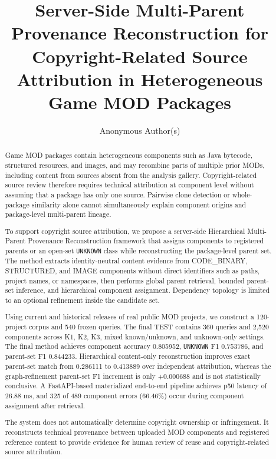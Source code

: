\documentclass[runningheads]{llncs}
\begin{document}
\title{Server-Side Multi-Parent Provenance Reconstruction for Copyright-Related Source Attribution in Heterogeneous Game MOD Packages}
\author{Anonymous Author(s)}
\maketitle

\begin{abstract}
Game MOD packages contain heterogeneous components such as Java bytecode, structured resources, and images, and may recombine parts of multiple prior MODs, including content from sources absent from the analysis gallery. Copyright-related source review therefore requires technical attribution at component level without assuming that a package has only one source. Pairwise clone detection or whole-package similarity alone cannot simultaneously explain component origins and package-level multi-parent lineage.

To support copyright source attribution, we propose a server-side Hierarchical Multi-Parent Provenance Reconstruction framework that assigns components to registered parents or an open-set \texttt{UNKNOWN} class while reconstructing the package-level parent set. The method extracts identity-neutral content evidence from CODE\_BINARY, STRUCTURED, and IMAGE components without direct identifiers such as paths, project names, or namespaces, then performs global parent retrieval, bounded parent-set inference, and hierarchical component assignment. Dependency topology is limited to an optional refinement inside the candidate set.

Using current and historical releases of real public MOD projects, we construct a 120-project corpus and 540 frozen queries. The final TEST contains 360 queries and 2,520 components across K1, K2, K3, mixed known/unknown, and unknown-only settings. The final method achieves component accuracy 0.805952, \texttt{UNKNOWN} F1 0.753786, and parent-set F1 0.844233. Hierarchical content-only reconstruction improves exact parent-set match from 0.286111 to 0.413889 over independent attribution, whereas the graph-refinement parent-set F1 increment is only +0.000688 and is not statistically conclusive. A FastAPI-based materialized end-to-end pipeline achieves p50 latency of 26.88 ms, and 325 of 489 component errors (66.46\%) occur during component assignment after retrieval.

The system does not automatically determine copyright ownership or infringement. It reconstructs technical provenance between uploaded MOD components and registered reference content to provide evidence for human review of reuse and copyright-related source attribution.

\end{abstract}
\end{document}
